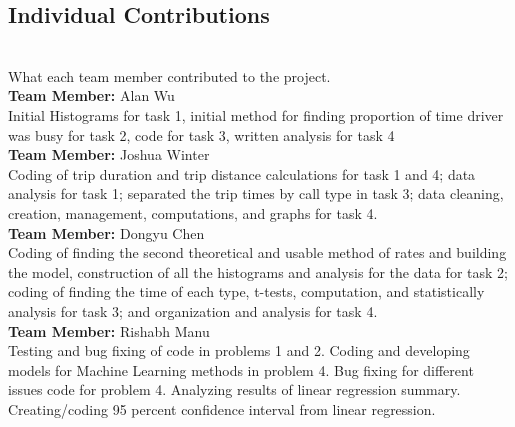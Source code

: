 \documentclass[letterpaper, 12 pt, conference]{article}
\begin{document}
\subsection{Individual Contributions}
\\ What each team member contributed to the project. \\
\textbf{Team Member: } Alan Wu \\
Initial Histograms for task 1, initial method for finding proportion of time driver was busy for task 2, code for task 3, written analysis for task 4 
\\
\textbf{Team Member: } Joshua Winter \\
Coding of trip duration and trip distance calculations for task 1 and 4; data analysis for task 1; separated the trip times by call type in task 3; data cleaning, creation, management, computations, and graphs for task 4. 
\\
\textbf{Team Member: } Dongyu  Chen \\
Coding of finding the second theoretical and usable method of rates and building the model, construction of all the histograms and  analysis for the data for task 2; coding of finding the time of each type, t-tests, computation, and statistically analysis for task 3; and organization and analysis for task 4.
\\
\textbf{Team Member: } Rishabh  Manu \\
Testing and bug fixing of code in  problems 1 and 2. Coding and developing models for Machine Learning methods in problem 4. Bug fixing for different issues code for problem 4. Analyzing results of linear regression summary. Creating/coding 95 percent confidence interval from linear regression.
\\
\end{document}
